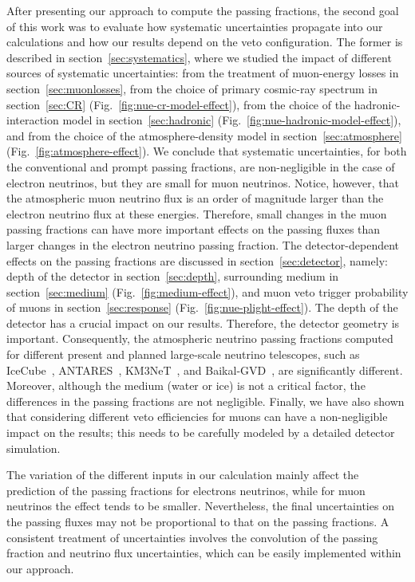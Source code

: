 \documentclass[aps,prd,showpacs,letterpaper,onecolumn,longbibliography,superscriptaddress,notitlepage,nofootinbib]{revtex4-1}%
\begin{document}
After presenting our approach to compute the passing fractions, the second goal of this work was to evaluate how systematic uncertainties propagate into our calculations and how our results depend on the veto configuration. The former is described in section~\ref{sec:systematics}, where we studied the impact of different sources of systematic uncertainties: from the treatment of muon-energy losses in section~\ref{sec:muonlosses}, from the choice of primary cosmic-ray spectrum in section~\ref{sec:CR} (Fig.~\ref{fig:nue-cr-model-effect}), from the choice of the hadronic-interaction model in section~\ref{sec:hadronic} (Fig.~\ref{fig:nue-hadronic-model-effect}), and from the choice of the atmosphere-density model in section~\ref{sec:atmosphere} (Fig.~\ref{fig:atmosphere-effect}). We conclude that systematic uncertainties, for both the conventional and prompt passing fractions, are non-negligible in the case of electron neutrinos, but they are small for muon neutrinos. Notice, however, that the atmospheric muon neutrino flux is an order of magnitude larger than the electron neutrino flux at these energies. Therefore, small changes in the muon passing fractions can have more important effects on the passing fluxes than larger changes in the electron neutrino passing fraction. The detector-dependent effects on the passing fractions are discussed in section~\ref{sec:detector}, namely: depth of the detector in section~\ref{sec:depth}, surrounding medium in section~\ref{sec:medium} (Fig.~\ref{fig:medium-effect}), and muon veto trigger probability of muons in section~\ref{sec:response} (Fig.~\ref{fig:nue-plight-effect}). The depth of the detector has a crucial impact on our results. Therefore, the detector geometry is important. Consequently, the atmospheric neutrino passing fractions computed for different present and planned large-scale neutrino telescopes, such as IceCube~\cite{Achterberg:2006md}, ANTARES~\cite{Collaboration:2011nsa}, KM3NeT~\cite{Adrian-Martinez:2016fdl}, and Baikal-GVD~\cite{Baikal2017}, are significantly different. Moreover, although the medium (water or ice) is not a critical factor, the differences in the passing fractions are not negligible. Finally, we have also shown that considering different veto efficiencies for muons can have a non-negligible impact on the results; this needs to be carefully modeled by a detailed detector simulation. 

The variation of the different inputs in our calculation mainly affect the prediction of the passing fractions for electrons neutrinos, while for muon neutrinos the effect tends to be smaller. Nevertheless, the final uncertainties on the passing fluxes may not be proportional to that on the passing fractions. A consistent treatment of uncertainties involves the convolution of the passing fraction and neutrino flux uncertainties, which can be easily implemented within our approach.
\end{document}
